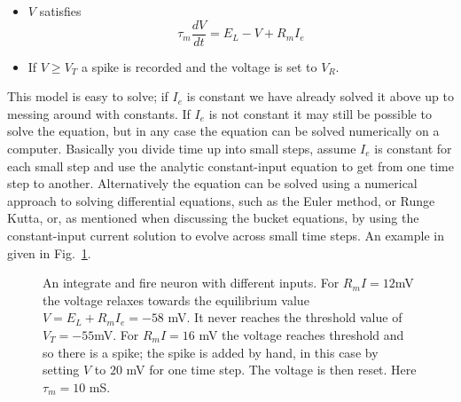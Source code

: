 \documentclass[11pt,a4paper]{scrartcl}
\begin{document}
\begin{itemize}
\item $V$ satisfies
\begin{equation}
\tau_m\frac{dV}{dt}=E_L-V+R_mI_e
\end{equation}
\item If $V\ge V_T$ a spike is recorded and the voltage is set to $V_R$.
\end{itemize}

This model is easy to solve; if $I_e$ is constant we have already
solved it above up to messing around with constants. If $I_e$ is not
constant it may still be possible to solve the equation, but in any
case the equation can be solved numerically on a computer. Basically
you divide time up into small steps, assume $I_e$ is constant for each
small step and use the analytic constant-input equation to get from
one time step to another. Alternatively the equation can be solved
using a numerical approach to solving differential equations, such as
the Euler method, or Runge Kutta, or, as mentioned when discussing the
bucket equations, by using the constant-input current solution to
evolve across small time steps. An example in given in Fig.~\ref{v_i_f}.

\begin{figure}
\begin{center}

\end{center}
\caption{An integrate and fire neuron with different inputs. For
  $R_mI=12 $mV the voltage relaxes towards the equilibrium value
  $V=E_L+R_mI_e=-58$ mV. It never reaches the threshold value of
  $V_T=-55 $mV. For $R_mI=16$ mV the voltage reaches threshold and so
  there is a spike; the spike is added by hand, in this case by
  setting $V$ to $20$ mV for one time step. The voltage is then
  reset. Here $\tau_m=10$ mS.\label{v_i_f}}
\end{figure}
\end{document}
